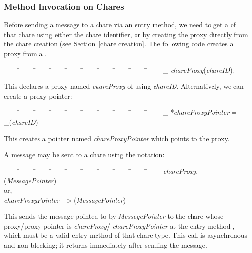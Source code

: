 \subsubsection{Method Invocation on Chares}

Before sending a message to a chare via an
entry method, we need to get a  of
that chare using either the chare identifier, or by creating the
proxy directly from the chare creation (see Section~\ref{chare
creation}. The following code creates a proxy from a
.

\begin{tabbing} ~~~~ \=~~~~ \=~~~~ \=~~~~ \=~~~~ \=~~~~ \=~~~~ \=~~~~ \=~~~~
\=~~~~ \kill \> \_ {\it chareProxy}({\it chareID});
\end{tabbing}

This declares a proxy named {\it chareProxy} of  using {\it
chareID}.  Alternatively, we can create a proxy pointer:

\begin{tabbing} ~~~~ \=~~~~ \=~~~~ \=~~~~ \=~~~~ \=~~~~ \=~~~~ \=~~~~ \=~~~~
\=~~~~ \kill \> \_ *{\it chareProxyPointer} = \_({\it chareID}); \end{tabbing}

This creates a pointer named {\it chareProxyPointer} which points to the proxy. 

A message  may be sent to a chare using the
notation:

\begin{tabbing} ~~~~ \=~~~~ \=~~~~ \=~~~~ \=~~~~ \=~~~~ \=~~~~ \=~~~~ \=~~~~
\=~~~~ \kill \> {\it chareProxy}$.$({\it MessagePointer}) \\ \>
\> or, \\ \> {\it chareProxyPointer}$->$({\it MessagePointer})
\end{tabbing}

This sends the message pointed to by {\it MessagePointer} to the
chare whose proxy/proxy pointer is {\it chareProxy}/{\it
chareProxyPointer} at the entry method ,
which must be a valid entry method of that chare type. This call
is asynchronous and non-blocking; it returns immediately after sending the
message. 

